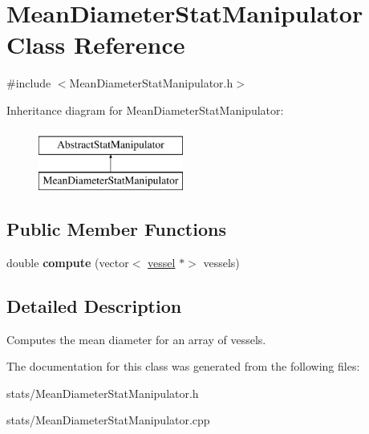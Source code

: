\hypertarget{class_mean_diameter_stat_manipulator}{}\section{Mean\+Diameter\+Stat\+Manipulator Class Reference}
\label{class_mean_diameter_stat_manipulator}


{\ttfamily \#include $<$Mean\+Diameter\+Stat\+Manipulator.\+h$>$}

Inheritance diagram for Mean\+Diameter\+Stat\+Manipulator\+:\begin{figure}[H]
\begin{center}
\leavevmode
\includegraphics[height=2.000000cm]{class_mean_diameter_stat_manipulator}
\end{center}
\end{figure}
\subsection*{Public Member Functions}
\begin{DoxyCompactItemize}
\item 
\mbox{\label{class_mean_diameter_stat_manipulator_a8376c09f92ef83440977dfbf28f022b7}} 
double {\bfseries compute} (vector$<$ \mbox{\hyperlink{structvessel}{vessel}} $\ast$$>$ vessels)
\end{DoxyCompactItemize}


\subsection{Detailed Description}
Computes the mean diameter for an array of vessels. 

The documentation for this class was generated from the following files\+:\begin{DoxyCompactItemize}
\item 
stats/Mean\+Diameter\+Stat\+Manipulator.\+h\item 
stats/Mean\+Diameter\+Stat\+Manipulator.\+cpp\end{DoxyCompactItemize}
